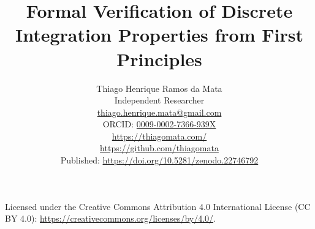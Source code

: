 \documentclass[11pt]{article}
\title{Formal Verification of Discrete Integration Properties from First Principles}
\author{%
  Thiago Henrique Ramos da Mata\\
  \small Independent Researcher\\
  \small \href{mailto:thiago.henrique.mata@gmail.com}{thiago.henrique.mata@gmail.com}\\
  \small ORCID: \href{https://orcid.org/0009-0002-7366-939X}{0009-0002-7366-939X}\\
  \small \url{https://thiagomata.com/}\\
  \small \url{https://github.com/thiagomata}\\
  \small Published: \url{https://doi.org/10.5281/zenodo.22746792}
}
\date{}
\begin{document}
\maketitle



\begin{center}
  \small Licensed under the Creative Commons Attribution 4.0 International
  License (CC BY 4.0): \url{https://creativecommons.org/licenses/by/4.0/}.
\end{center}


















\appendix

\end{document}
